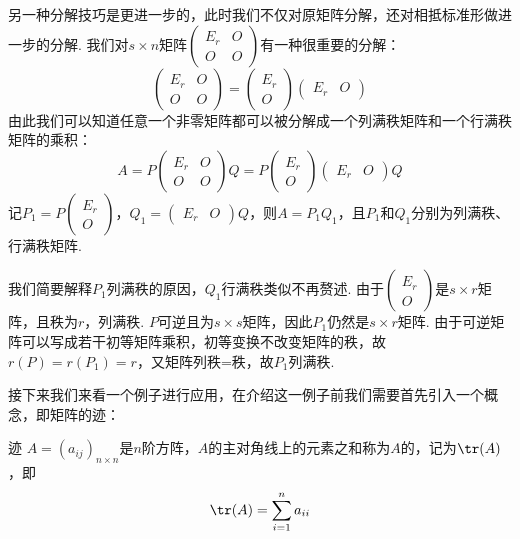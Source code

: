 另一种分解技巧是更进一步的，此时我们不仅对原矩阵分解，还对相抵标准形做进一步的分解. 我们对$s \times n$矩阵$\begin{pmatrix}
        E_r & O \\ O & O
    \end{pmatrix}$有一种很重要的分解：
\[\begin{pmatrix}
        E_r & O \\ O & O
    \end{pmatrix}=\begin{pmatrix}
        E_r \\ O
    \end{pmatrix}\begin{pmatrix}
        E_r & O
    \end{pmatrix}\]
由此我们可以知道任意一个非零矩阵都可以被分解成一个列满秩矩阵和一个行满秩矩阵的乘积：
\[A=P\begin{pmatrix}
        E_r & O \\ O & O
    \end{pmatrix}Q=P\begin{pmatrix}
        E_r \\ O
    \end{pmatrix}\begin{pmatrix}
        E_r & O
    \end{pmatrix}Q\]
记$P_1=P\begin{pmatrix}
        E_r \\ O
    \end{pmatrix}$，$Q_1=\begin{pmatrix}
        E_r & O
    \end{pmatrix}Q$，则$A=P_1Q_1$，且$P_1$和$Q_1$分别为列满秩、行满秩矩阵.

我们简要解释$P_1$列满秩的原因，$Q_1$行满秩类似不再赘述. 由于$\begin{pmatrix}
        E_r \\ O
    \end{pmatrix}$是$s\times r$矩阵，且秩为$r$，列满秩. $P$可逆且为$s\times s$矩阵，因此$P_1$仍然是$s\times r$矩阵. 由于可逆矩阵可以写成若干初等矩阵乘积，初等变换不改变矩阵的秩，故$r(P)=r(P_1)=r$，又矩阵列秩=秩，故$P_1$列满秩.

接下来我们来看一个例子进行应用，在介绍这一例子前我们需要首先引入一个概念，即矩阵的迹：
\begin{definition}{迹}{} 
    $A=(a_{ij})_{n\times n}$是$n$阶方阵，$A$的主对角线上的元素之和称为$A$的，记为$\tr(A)$，即
    \[\tr(A)=\sum_{i=1}^n a_{ii}\]
\end{definition}

